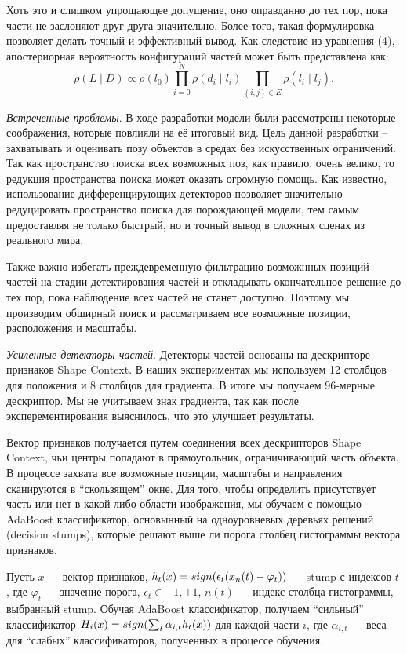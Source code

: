 Хоть это и слишком упрощающее допущение, оно оправданно до тех пор, пока части не заслоняют друг друга значительно. Более того, такая формулировка позволяет делать точный и эффективный вывод. Как следствие из уравнения (4), апостериорная вероятность конфигураций частей может быть представлена как:
\begin{equation}
  \rho(L{\mid}D) \propto \rho(l_0) \prod_{i = 0}^N\rho(d_i{\mid}l_i) \prod_{(i, j) \in E}\rho(l_i{\mid}l_j).
\end{equation}

\emph{Встреченные проблемы}. В ходе разработки модели были рассмотрены некоторые соображения, которые повлияли на её итоговый вид. Цель данной разработки -- захватывать и оценивать позу объектов в средах без искусственных ограничений. Так как пространство поиска всех возможных поз, как правило, очень велико, то редукция пространства поиска может оказать огромную помощь. Как известно, использование дифференцирующих детекторов позволяет значительно редуцировать пространство поиска для порождающей модели, тем самым предоставляя не только быстрый, но и точный вывод в сложных сценах из реального мира.

Также важно избегать преждевременную фильтрацию возможнных позиций частей на стадии детектирования частей и откладывать окончательное решение до тех пор, пока наблюдение всех частей не станет доступно. Поэтому мы производим обширный поиск и рассматриваем все возможные позиции, расположения и масштабы.

\emph{Усиленные детекторы частей}. Детекторы частей основаны на дескрипторе признаков Shape Context. В наших экспериментах мы используем 12 столбцов для положения и 8 столбцов для градиента. В итоге мы получаем 96-мерные дескриптор. Мы не учитываем знак градиента, так как после эксперементирования выяснилось, что это улучшает результаты.

Вектор признаков получается путем соединения всех дескрипторов Shape Context, чьи центры попадают в прямоугольник, ограничивающий часть объекта. В процессе захвата все возможные позиции, масштабы и направления сканируются в ``скользящем'' окне. Для того, чтобы определить присутствует часть или нет в какой-либо области изображения, мы обучаем с помощью AdaBoost классификатор, основынный на одноуровневых деревьях решений (decision stumps), которые решают выше ли порога столбец гистограммы вектора признаков.

Пусть $x$ --- вектор признаков, $h_t(x) = sign(\epsilon_t(x_n(t) - \varphi_t))$ --- stump с индексов $t$, где $\varphi_t$ --- значение порога, $\epsilon_t \in {-1, +1}$, $n(t)$ --- индекс столбца гистограммы, выбранный stump. Обучая AdaBoost классификатор, получаем ``сильный'' классификатор $H_i(x) = sign(\sum_t{\alpha_{i,t}h_t(x)})$ для каждой части $i$, где $\alpha_{i,t}$ --- веса для ``слабых'' классификаторов, полученных в процессе обучения.

